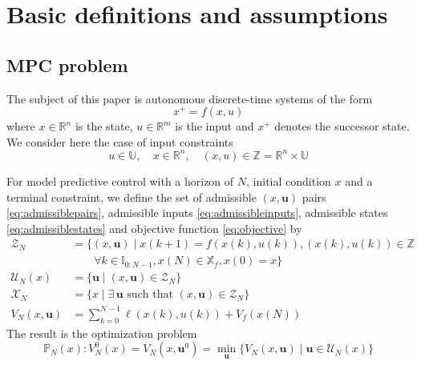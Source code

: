 \documentclass{article}
\begin{document}
\section{Basic definitions and assumptions}
\subsection{MPC problem}
\label{sec:mpc}
The subject of this paper is autonomous discrete-time systems of the form 
\begin{equation}
\label{eq:system}
x^+=f(x,u) 
\end{equation}
where $x \in \mathbb{R}^n$ is the state, $u \in \mathbb{R}^m$ is the input
and $x^+$ denotes the successor state. 
We consider here the case of input constraints
\begin{equation*}
u \in \mathbb{U}, \quad x \in \mathbb{R}^n, \quad (x,u) \in \mathbb{Z} =   \mathbb{R}^n \times \mathbb{U}
\end{equation*}
\begin{comment}
The state and input are 
subject to the constraints
\begin{equation*}
(x,u) \in \mathbb{X} \times \mathbb{U}
\end{equation*}
\end{comment}
For model predictive control with a horizon of $N$, initial condition $x$ 
and a terminal constraint, we define the set of admissible 
$(x,\mathbf{u})$ pairs \eqref{eq:admissiblepairs}, admissible inputs
\eqref{eq:admissibleinputs}, admissible states
\eqref{eq:admissiblestates} and objective function \eqref{eq:objective} by
\begin{align}
\label{eq:admissiblepairs}
\mathcal{Z}_N &= \{ (x,\mathbf{u}) \mid
x(k+1)=f(x(k),u(k)), (x(k),u(k)) \in \mathbb{Z} \\ \nonumber
&\quad \quad \forall k \in \mathbb{I}_{0:N-1}, x(N) \in \mathbb{X}_f, x(0)=x \} \\
\label{eq:admissibleinputs}
\mathcal{U}_N(x) &= \{\mathbf{u} \mid (x,\mathbf{u}) \in \mathcal{Z}_N \}
\\
\label{eq:admissiblestates}
\mathcal{X}_N &= \{x \mid 
\exists \, \mathbf{u} \text{ such that  } (x,\mathbf{u}) \in \mathcal{Z}_N \}
\\
\label{eq:objective}
 V_N ( x, \mathbf{u} ) &= \sum_{k=0}^{N-1} \ell ( x(k),u(k) ) + V_f(x(N))
\end{align}
The result is the optimization problem %
\begin{equation}
\label{eq:mpc}
\mathbb{P}_N(x): V_N^0(x)=V_N(x,\mathbf{u}^0)=
\min_\mathbf{u} \Big \{ V_N(x,\mathbf{u}) \mid \mathbf{u} \in \mathcal{U}_N(x) \Big \}
\end{equation}
\end{document}

